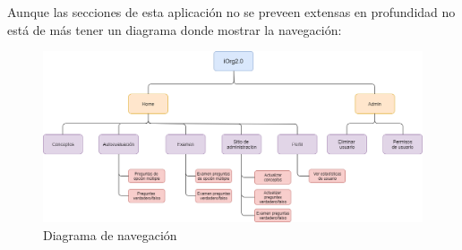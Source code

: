 \bigskip
Aunque las secciones de esta aplicación no se preveen extensas en profundidad no está de más tener un diagrama donde mostrar la navegación:

\begin{figure}[!ht]
  \begin{center}
    \includegraphics[width=1\textwidth]{../images/diagrama_navegacion.png}
    \caption{Diagrama de navegación}
    \label{fig:diagrama_navegacion}
  \end{center}
\end{figure}



